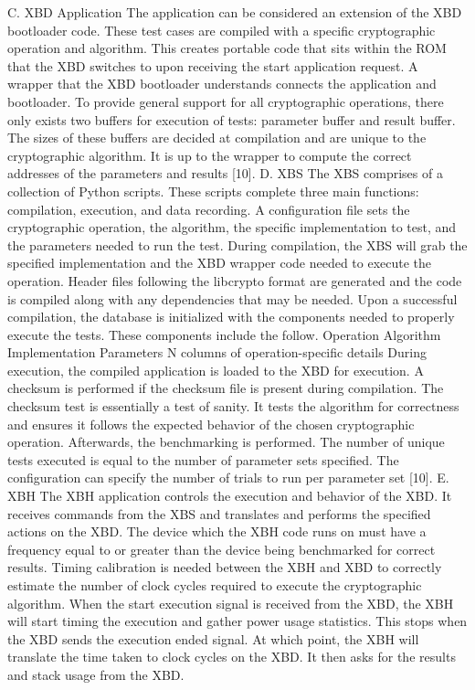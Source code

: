 C. XBD Application
The application can be considered an extension of the XBD bootloader code. These test cases are compiled with a specific
cryptographic operation and algorithm. This creates portable code that sits within the ROM that the XBD switches to upon receiving the start application request.
A wrapper that the XBD bootloader understands connects the application and bootloader. To provide general support for all cryptographic operations, there only exists two buffers for execution of tests: parameter buffer and result buffer. The sizes of these buffers are decided at compilation and are unique to the cryptographic algorithm. It is up to the wrapper to compute the correct addresses of the parameters and results [10].
D. XBS
The XBS comprises of a collection of Python scripts. These scripts complete three main functions: compilation, execution, and data recording.
A configuration file sets the cryptographic operation, the algorithm, the specific implementation to test, and the parameters needed to run the test. During compilation, the XBS will grab the specified implementation and the XBD wrapper code needed to execute the operation. Header files following the libcrypto format are generated and the code is compiled along with any dependencies that may be needed.
Upon a successful compilation, the database is initialized with the components needed to properly execute the tests. These components include the follow.
Operation
Algorithm
Implementation
Parameters
N columns of operation-specific details
During execution, the compiled application is loaded to the XBD for execution. A checksum is performed if the checksum file is present during compilation. The checksum test is essentially a test of sanity. It tests the algorithm for correctness and ensures it follows the expected behavior of the chosen cryptographic operation. Afterwards, the benchmarking is performed. The number of unique tests executed is equal to the number of parameter sets specified. The configuration can specify the number of trials to run per parameter set [10].
E. XBH
The XBH application controls the execution and behavior of the XBD. It receives commands from the XBS and translates and performs the specified actions on the XBD.
The device which the XBH code runs on must have a frequency equal to or greater than the device being benchmarked for correct results. Timing calibration is needed between the XBH and XBD to correctly estimate the number of clock cycles required to execute the cryptographic algorithm. When the start execution signal is received from the XBD, the XBH will start timing the execution and gather power usage statistics. This stops when the XBD sends the execution ended signal. At which point, the XBH will translate the time taken to clock cycles on the XBD. It then asks for the results and stack usage from the XBD.
